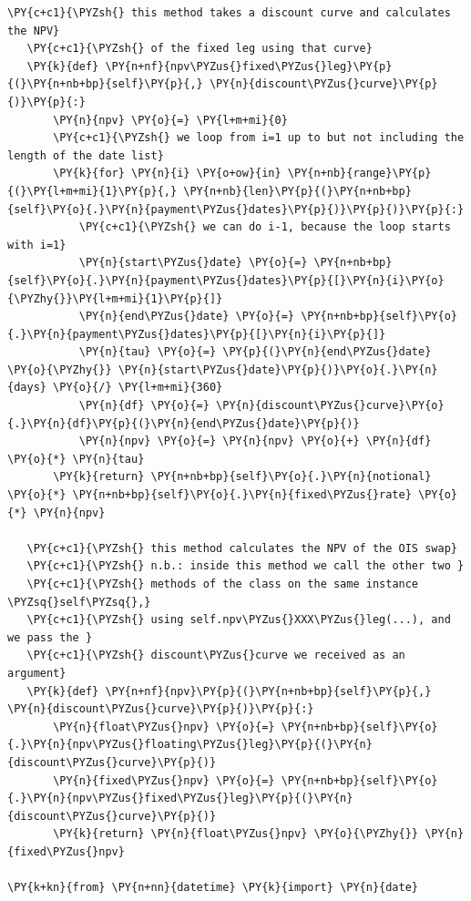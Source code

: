 \begin{tcolorbox}[breakable, size=fbox, boxrule=1pt, pad at break*=1mm,colback=cellbackground, colframe=cellborder]
\begin{Verbatim}[commandchars=\\\{\}]
   \PY{c+c1}{\PYZsh{} this method takes a discount curve and calculates the NPV}
   \PY{c+c1}{\PYZsh{} of the fixed leg using that curve}
   \PY{k}{def} \PY{n+nf}{npv\PYZus{}fixed\PYZus{}leg}\PY{p}{(}\PY{n+nb+bp}{self}\PY{p}{,} \PY{n}{discount\PYZus{}curve}\PY{p}{)}\PY{p}{:}
       \PY{n}{npv} \PY{o}{=} \PY{l+m+mi}{0}
       \PY{c+c1}{\PYZsh{} we loop from i=1 up to but not including the length of the date list}
       \PY{k}{for} \PY{n}{i} \PY{o+ow}{in} \PY{n+nb}{range}\PY{p}{(}\PY{l+m+mi}{1}\PY{p}{,} \PY{n+nb}{len}\PY{p}{(}\PY{n+nb+bp}{self}\PY{o}{.}\PY{n}{payment\PYZus{}dates}\PY{p}{)}\PY{p}{)}\PY{p}{:} 
           \PY{c+c1}{\PYZsh{} we can do i-1, because the loop starts with i=1}
           \PY{n}{start\PYZus{}date} \PY{o}{=} \PY{n+nb+bp}{self}\PY{o}{.}\PY{n}{payment\PYZus{}dates}\PY{p}{[}\PY{n}{i}\PY{o}{\PYZhy{}}\PY{l+m+mi}{1}\PY{p}{]} 
           \PY{n}{end\PYZus{}date} \PY{o}{=} \PY{n+nb+bp}{self}\PY{o}{.}\PY{n}{payment\PYZus{}dates}\PY{p}{[}\PY{n}{i}\PY{p}{]}
           \PY{n}{tau} \PY{o}{=} \PY{p}{(}\PY{n}{end\PYZus{}date} \PY{o}{\PYZhy{}} \PY{n}{start\PYZus{}date}\PY{p}{)}\PY{o}{.}\PY{n}{days} \PY{o}{/} \PY{l+m+mi}{360}
           \PY{n}{df} \PY{o}{=} \PY{n}{discount\PYZus{}curve}\PY{o}{.}\PY{n}{df}\PY{p}{(}\PY{n}{end\PYZus{}date}\PY{p}{)}
           \PY{n}{npv} \PY{o}{=} \PY{n}{npv} \PY{o}{+} \PY{n}{df} \PY{o}{*} \PY{n}{tau}
       \PY{k}{return} \PY{n+nb+bp}{self}\PY{o}{.}\PY{n}{notional} \PY{o}{*} \PY{n+nb+bp}{self}\PY{o}{.}\PY{n}{fixed\PYZus{}rate} \PY{o}{*} \PY{n}{npv}
   
   \PY{c+c1}{\PYZsh{} this method calculates the NPV of the OIS swap}
   \PY{c+c1}{\PYZsh{} n.b.: inside this method we call the other two }
   \PY{c+c1}{\PYZsh{} methods of the class on the same instance \PYZsq{}self\PYZsq{},}
   \PY{c+c1}{\PYZsh{} using self.npv\PYZus{}XXX\PYZus{}leg(...), and we pass the }
   \PY{c+c1}{\PYZsh{} discount\PYZus{}curve we received as an argument}
   \PY{k}{def} \PY{n+nf}{npv}\PY{p}{(}\PY{n+nb+bp}{self}\PY{p}{,} \PY{n}{discount\PYZus{}curve}\PY{p}{)}\PY{p}{:}
       \PY{n}{float\PYZus{}npv} \PY{o}{=} \PY{n+nb+bp}{self}\PY{o}{.}\PY{n}{npv\PYZus{}floating\PYZus{}leg}\PY{p}{(}\PY{n}{discount\PYZus{}curve}\PY{p}{)}
       \PY{n}{fixed\PYZus{}npv} \PY{o}{=} \PY{n+nb+bp}{self}\PY{o}{.}\PY{n}{npv\PYZus{}fixed\PYZus{}leg}\PY{p}{(}\PY{n}{discount\PYZus{}curve}\PY{p}{)}
       \PY{k}{return} \PY{n}{float\PYZus{}npv} \PY{o}{\PYZhy{}} \PY{n}{fixed\PYZus{}npv}

\PY{k+kn}{from} \PY{n+nn}{datetime} \PY{k}{import} \PY{n}{date}


\end{Verbatim}
\end{tcolorbox}

